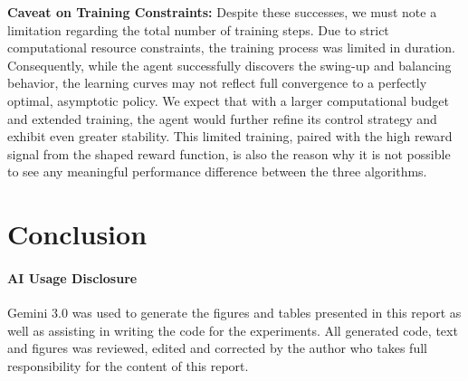 \documentclass{article}
\begin{document}
\textbf{Caveat on Training Constraints:} Despite these successes, we must note a limitation regarding the total number of training steps. Due to strict computational resource constraints, the training process was limited in duration. Consequently, while the agent successfully discovers the swing-up and balancing behavior, the learning curves may not reflect full convergence to a perfectly optimal, asymptotic policy. We expect that with a larger computational budget and extended training, the agent would further refine its control strategy and exhibit even greater stability. This limited training, paired with the high reward signal from the shaped reward function, is also the reason why it is not possible to see any meaningful performance difference between the three algorithms.

\section{Conclusion}

\paragraph{AI Usage Disclosure}
Gemini 3.0 was used to generate the figures and tables presented in this report as well as assisting in writing the code for the experiments. All generated code, text and figures was reviewed, edited and corrected by the author who takes full responsibility for the content of this report.


\end{document}

